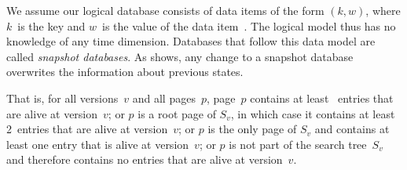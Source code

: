 We assume our logical database consists of data items of the form $(k,
w)$, where $k$~is the key and $w$~is the value of
the data item~\cite{sippu:2001:theory}.
The logical model thus has no knowledge of any time dimension.
Databases that follow this data model are called
\emph{snapshot databases}\label{def:snapshot-database}.
As  shows, any change to a snapshot database
overwrites the information about previous states.

\thmskip
\begin{invariant}
\label{inv:tmvbt-live-count}
That is, for all versions~$v$ and all pages~$p$, page~$p$ contains at least
\minlive\ entries that are alive at version~$v$; or $p$ is a root page of
$S_v$, in which case it contains at least \num{2}~entries that are alive at
version~$v$; or $p$ is the only page of $S_v$ and contains at least one entry
that is alive at version~$v$; or $p$ is not part of the search tree~$S_v$ and
therefore contains no entries that are alive at version~$v$.
\end{invariant}
\thmskip

\begin{figure}[htb]
\centering

\label{fig:tx-snapshot}
\end{figure}

\begin{figure}[htb]
\centering

\label{fig:tx-valid}
\end{figure}

\begin{figure}[htb]
\centering

\label{fig:tx-transaction}
\end{figure}

